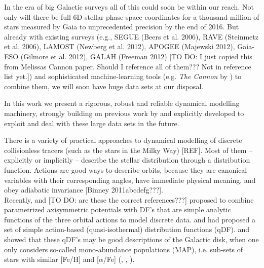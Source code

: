 In the era of big Galactic surveys all of this could soon be within our reach. Not only will there be full 6D stellar phase-space coordinates for a thousand million of stars measured by Gaia to unprecedented precision by the end of 2016. But already with existing surveys (e.g., SEGUE (Beers et al. 2006), RAVE (Steinmetz et al. 2006), LAMOST (Newberg et al. 2012), APOGEE (Majewski 2012), Gaia-ESO (Gilmore et al. 2012), GALAH (Freeman 2012) [TO DO: I just copied this from Melissas Cannon paper. Should I reference all of them??? Not in reference list yet.]) and sophisticated machine-learning tools (e.g. \emph{The Cannon} by \cite{nes15}) to combine them, we will soon have huge data sets at our disposal.

In this work we present a rigorous, robust and reliable dynamical modelling machinery, strongly building on previous work by \cite{bin11,bin12,bov13,bov15} and explicitly developed to exploit and deal with these large data sets in the future.

There is a variety of practical approaches to dynamical modelling of discrete collisionless tracers (such as the stars in the Milky Way) [REF]. Most of them -- explicitly or implicitly -- describe the stellar distribution through a distribution function.  Actions are good ways to describe orbits, because they are canonical variables with their corresponding angles, have immediate physical meaning, and obey adiabatic invariance [Binney 2011abcdefg???]. \\

Recently, \cite{bin12b} and \cite{bov13} [TO DO: are these the correct references???] proposed to combine parametrized axisymmetric potentials with DF's that are simple analytic functions of the three orbital actions to model discrete data. \cite{bin10} and \cite{bin11} had proposed a set of simple action-based (quasi-isothermal) distribution functions (qDF). \cite{Tin13} and \cite{bov13} showed that these qDF's may be good descriptions of the Galactic disk, when one only considers so-called mono-abundance populations (MAP), i.e. sub-sets of stars with similar [Fe/H] and [$\alpha$/Fe] (\cite{bov12b}, \cite{bov12c}, \cite{bov12d}). \\

